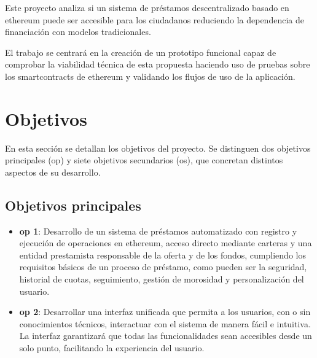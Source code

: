 Este proyecto analiza si un sistema de préstamos descentralizado basado en 
\gls{ethereum} puede ser accesible para los ciudadanos reduciendo la dependencia 
de financiación con modelos 
tradicionales.

El trabajo se centrará en la creación de un prototipo funcional capaz de 
comprobar la viabilidad técnica de esta propuesta haciendo uso de pruebas 
sobre los \glspl{smartcontract} de \gls{ethereum} y validando los flujos 
de uso de la aplicación.




\section{Objetivos}

En esta sección se detallan los objetivos del proyecto. Se distinguen dos
objetivos principales (\gls{op}) y siete objetivos secundarios (\gls{os}),
que concretan distintos aspectos de su desarrollo.



\subsection{Objetivos principales}

\begin{itemize}
    \item {}\label{op:1}\textbf{\gls{op} 1}: Desarrollo de un sistema de préstamos automatizado 
    con registro y ejecución de operaciones en \gls{ethereum}, acceso directo mediante
    carteras y una entidad prestamista responsable de la oferta y de los fondos,
    cumpliendo
    los requisitos básicos de un proceso de préstamo, como pueden ser la seguridad, 
    historial de cuotas, seguimiento, gestión de morosidad y personalización 
    del usuario.
    
    \item {}\label{op:2}\textbf{\gls{op} 2}: Desarrollar una interfaz unificada que permita a los usuarios, 
    con o sin conocimientos técnicos, interactuar con el sistema de manera fácil e 
    intuitiva. La interfaz garantizará que todas las funcionalidades sean accesibles 
    desde un solo punto, facilitando la experiencia del usuario.
\end{itemize}

